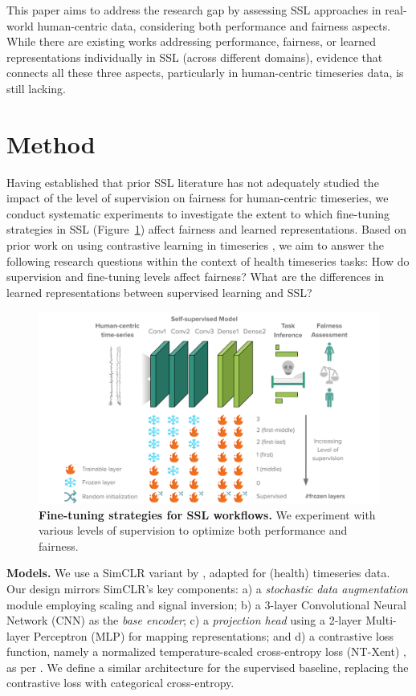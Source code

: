 \documentclass[letterpaper]{article} %
\begin{document}
This paper aims to address the research gap by assessing SSL approaches in real-world human-centric data, considering both performance and fairness aspects.
While there are existing works addressing performance, fairness, or learned representations individually in SSL (across different domains), evidence that connects all these three aspects, particularly in human-centric timeseries data, is still lacking.

\section{Method}
\label{sec:method}
Having established that prior SSL literature has not adequately studied the impact of the level of supervision on fairness for human-centric timeseries, we conduct systematic experiments to investigate the extent to which fine-tuning strategies in SSL (Figure~\ref{fig:modelsummaries}) affect fairness and learned representations. Based on prior work on using contrastive learning in timeseries \cite{tang2020exploring}, we aim to answer the following research questions within the context of health timeseries tasks: How do supervision and fine-tuning levels affect fairness? What are the differences in learned representations between supervised learning and SSL?

\begin{figure}[htb!]
  \centering
  \includegraphics[trim={2cm 0 2.2cm 0cm},clip,width=.9\linewidth]{img/overview.pdf}
  \caption{\textbf{Fine-tuning strategies for SSL workflows.} We experiment with various levels of supervision to optimize both performance and fairness.}
  \label{fig:modelsummaries}
  \vspace{-0.25cm}
\end{figure}

\noindent\textbf{Models.} 
We use a SimCLR \cite{chen2020simple} variant by \citet{tang2020exploring}, adapted for (health) timeseries data. Our design mirrors SimCLR's key components: a) a \textit{stochastic data augmentation} module employing scaling and signal inversion; b) a 3-layer Convolutional Neural Network (CNN) as the \textit{base encoder}; c) a \textit{projection head} using a 2-layer Multi-layer Perceptron (MLP) for mapping representations; and d) a contrastive loss function, namely a normalized temperature-scaled cross-entropy loss (NT-Xent) \cite{sohn2016improved,chen2020simple}, as per \citet{tang2020exploring}. We define a similar architecture for the supervised baseline, replacing the contrastive loss with categorical cross-entropy.
\end{document}
